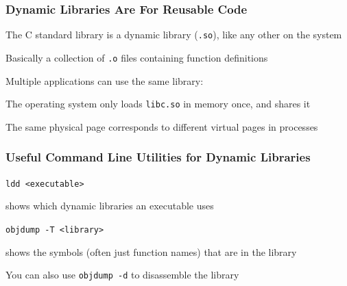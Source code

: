 \documentclass[aspectratio=169]{beamer}
\begin{document}
  \begin{frame}
    \frametitle{Dynamic Libraries Are For Reusable Code}

    The C standard library is a dynamic library (\texttt{.so}), like any other
    on the system

    \hspace{1em} Basically a collection of \texttt{.o} files containing function
    definitions

    \vspace{1em}

    Multiple applications can use the same library:

    \vspace{1em}


    \vspace{1em}

    The operating system only loads \texttt{libc.so} in memory once, and shares
    it

    \hspace{1em} The same physical page corresponds to different virtual pages
    in processes
  \end{frame}

  \begin{frame}
    \frametitle{Useful Command Line Utilities for Dynamic Libraries}

    \texttt{ldd <executable>}

    \hspace{1em} shows which dynamic libraries an executable uses

    \vspace{4em}

    \texttt{objdump -T <library>}

    \hspace{1em} shows the symbols (often just function names) that are in the
    library

    \vspace{1em}

    You can also use \texttt{objdump -d} to disassemble the library
  \end{frame}
\end{document}
